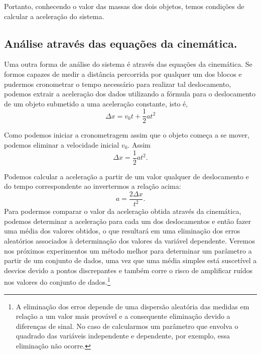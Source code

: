 Portanto, conhecendo o valor das massas dos dois objetos, temos condições de calcular a aceleração do sistema.

\subsection{Análise através das equações da cinemática.}

Uma outra forma de análise do sistema é através das equações da cinemática. Se formos capazes de medir a distância percorrida por qualquer um dos blocos e pudermos cronometrar o tempo necessário para realizar tal deslocamento, podemos extrair a aceleração dos dados utilizando a fórmula para o deslocamento de um objeto submetido a uma aceleração constante, isto é,
	\begin{equation}
		\Delta x = v_0 t + \frac{1}{2} at^2
	\end{equation}

Como podemos iniciar a cronometragem assim que o objeto começa a se mover, podemos eliminar a velocidade inicial $v_0$. Assim
\begin{equation}
	\Delta x = \frac{1}{2} at^2.
\end{equation}

Podemos calcular a aceleração a partir de um valor qualquer de deslocamento e do tempo correspondente ao invertermos a relação acima:
\begin{equation}\label{LeisDeNewton:Eq:AceleracaoCinematica}
	a = \frac{2 \Delta x}{t^2}.
\end{equation}
%
Para podermos comparar o valor da aceleração obtida através da cinemática, podemos determinar a aceleração para cada um dos deslocamentos e então fazer uma média dos valores obtidos, o que resultará em uma eliminação dos erros aleatórios associados à determinação dos valores da variável dependente. Veremos nos próximos experimentos um método melhor para determinar um parâmetro a partir de um conjunto de dados, uma vez que uma média simples está suscetível a desvios devido a pontos discrepantes e também corre o risco de amplificar ruídos nos valores do conjunto de dados.\footnote{A eliminação dos erros depende de uma dispersão aleatória das medidas em relação a um valor mais provável e a consequente eliminação devido a diferenças de sinal. No caso de calcularmos um parâmetro que envolva o quadrado das variáveis independente e dependente, por exemplo, essa eliminação não ocorre.}

